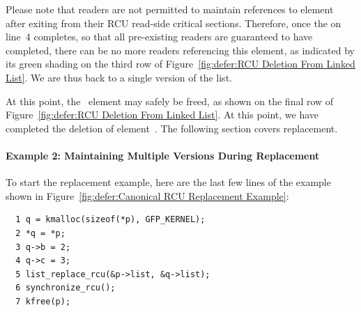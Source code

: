 Please note that readers are not permitted to maintain references to
element~ after exiting from their RCU read-side
critical sections.
Therefore,
once the  on
line~4 completes, so that all pre-existing readers are
guaranteed to have completed,
there can be no more readers referencing this
element, as indicated by its green shading on the third row of
Figure~\ref{fig:defer:RCU Deletion From Linked List}.
We are thus back to a single version of the list.

At this point, the ~element may safely be
freed, as shown on the final row of
Figure~\ref{fig:defer:RCU Deletion From Linked List}.
At this point, we have completed the deletion of
element~.
The following section covers replacement.

\paragraph{Example 2: Maintaining Multiple Versions During Replacement}
\label{sec:defer:Example 2: Maintaining Multiple Versions During Replacement}

To start the replacement example,
here are the last few lines of the
example shown in
Figure~\ref{fig:defer:Canonical RCU Replacement Example}:

\vspace{5pt}
\begin{minipage}[t]{\columnwidth}
\begin{verbatim}
  1 q = kmalloc(sizeof(*p), GFP_KERNEL);
  2 *q = *p;
  3 q->b = 2;
  4 q->c = 3;
  5 list_replace_rcu(&p->list, &q->list);
  6 synchronize_rcu();
  7 kfree(p);
\end{verbatim}
\end{minipage}
\vspace{5pt}

